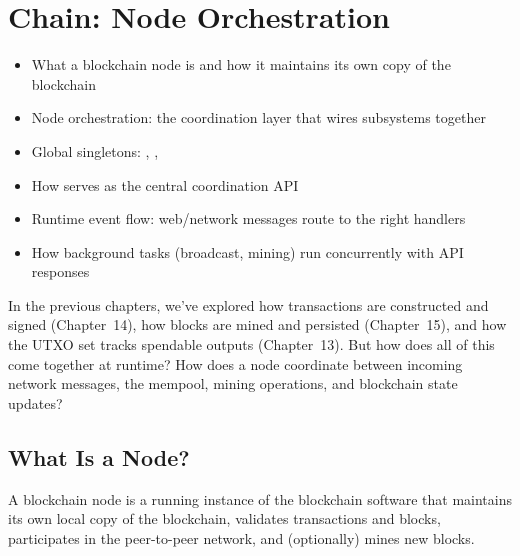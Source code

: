 \chapter{Chain: Node Orchestration}
\label{ch:chain-node-orchestration}

\begin{learnbox}
\begin{itemize}
  \item What a blockchain node is and how it maintains its own copy of the blockchain
  \item Node orchestration: the coordination layer that wires subsystems together
  \item Global singletons: , , 
  \item How  serves as the central coordination API
  \item Runtime event flow: web/network messages route to the right handlers
  \item How background tasks (broadcast, mining) run concurrently with API responses
\end{itemize}
\end{learnbox}

In the previous chapters, we've explored how transactions are constructed and signed (Chapter~14), how blocks are mined and persisted (Chapter~15), and how the UTXO set tracks spendable outputs (Chapter~13). But how does all of this come together at runtime? How does a node coordinate between incoming network messages, the mempool, mining operations, and blockchain state updates?

\section{What Is a Node?}
\label{sec:ch09-8-whatisnode}

A blockchain node is a running instance of the blockchain software that maintains its own local copy of the blockchain, validates transactions and blocks, participates in the peer-to-peer network, and (optionally) mines new blocks.

